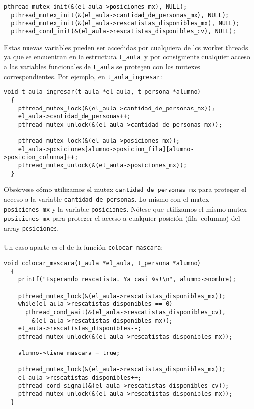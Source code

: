 \begin{lstlisting}[frame=leftline]
  pthread_mutex_init(&(el_aula->posiciones_mx), NULL);
  pthread_mutex_init(&(el_aula->cantidad_de_personas_mx), NULL);
  pthread_mutex_init(&(el_aula->rescatistas_disponibles_mx), NULL);
  pthread_cond_init(&(el_aula->rescatistas_disponibles_cv), NULL);
\end{lstlisting}
  
Estas nuevas variables pueden ser accedidas por cualquiera de los worker threads ya que se encuentran en la estructura \texttt{t\_aula}, y por consiguiente cualquier acceso a las variables funcionales de \texttt{t\_aula} se protegen con los mutexes correspondientes. Por ejemplo, en \texttt{t\_aula\_ingresar}:

\begin{lstlisting}[frame=leftline]
  void t_aula_ingresar(t_aula *el_aula, t_persona *alumno)
  {
    pthread_mutex_lock(&(el_aula->cantidad_de_personas_mx));
    el_aula->cantidad_de_personas++;
    pthread_mutex_unlock(&(el_aula->cantidad_de_personas_mx));

    pthread_mutex_lock(&(el_aula->posiciones_mx));
    el_aula->posiciones[alumno->posicion_fila][alumno->posicion_columna]++;
    pthread_mutex_unlock(&(el_aula->posiciones_mx));
  }
\end{lstlisting}

Obsérvese cómo utilizamos el mutex \texttt{cantidad\_de\_personas\_mx} para proteger el acceso a la variable \texttt{cantidad\_de\_personas}. Lo mismo con el mutex \texttt{posiciones\_mx} y la variable \texttt{posiciones}. Nótese que utilizamos el mismo mutex \texttt{posiciones\_mx} para proteger el acceso a cualquier posición (fila, columna) del array \texttt{posiciones}.
\\\\  
Un caso aparte es el de la función \texttt{colocar\_mascara}:

\begin{lstlisting}[frame=leftline]
  void colocar_mascara(t_aula *el_aula, t_persona *alumno)
  {
    printf("Esperando rescatista. Ya casi %s!\n", alumno->nombre);

    pthread_mutex_lock(&(el_aula->rescatistas_disponibles_mx));
    while(el_aula->rescatistas_disponibles == 0)
      pthread_cond_wait(&(el_aula->rescatistas_disponibles_cv), 
        &(el_aula->rescatistas_disponibles_mx));
    el_aula->rescatistas_disponibles--;
    pthread_mutex_unlock(&(el_aula->rescatistas_disponibles_mx));
    
    alumno->tiene_mascara = true;

    pthread_mutex_lock(&(el_aula->rescatistas_disponibles_mx));
    el_aula->rescatistas_disponibles++;
    pthread_cond_signal(&(el_aula->rescatistas_disponibles_cv));
    pthread_mutex_unlock(&(el_aula->rescatistas_disponibles_mx));
  }
\end{lstlisting}

